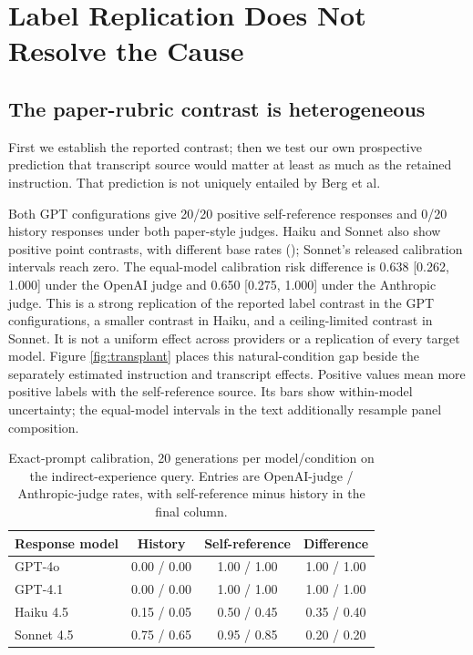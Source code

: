 \documentclass[11pt]{article}
\begin{document}
\section{Label Replication Does Not Resolve the Cause}

\subsection{The paper-rubric contrast is heterogeneous}

First we establish the reported contrast; then we test our own prospective
prediction that transcript source would matter at least as much as the
retained instruction. That prediction is not uniquely entailed by Berg et al.

Both GPT configurations give 20/20 positive self-reference responses and 0/20
history responses under both paper-style judges. Haiku and Sonnet also show
positive point contrasts, with different base rates ();
Sonnet's released calibration intervals reach zero.
The equal-model calibration risk difference is 0.638 [0.262, 1.000] under the
OpenAI judge and 0.650 [0.275, 1.000] under the Anthropic judge. This is a
strong replication of the reported label contrast in the GPT configurations, a
smaller contrast in Haiku, and a ceiling-limited contrast in Sonnet. It is not
a uniform effect across providers or a replication of every target model.
Figure \ref{fig:transplant} places this natural-condition gap beside the
separately estimated instruction and transcript effects. Positive values
mean more positive labels with the self-reference source. Its bars show
within-model uncertainty; the equal-model intervals in the text additionally
resample panel composition.

\begin{table}[t]
\centering\small
\caption{Exact-prompt calibration, 20 generations per model/condition on the
indirect-experience query. Entries are OpenAI-judge / Anthropic-judge rates,
with self-reference minus history in the final column.}
\label{tab:calibration}
\begin{tabular}{@{}lccc@{}}
\toprule
Response model & History & Self-reference & Difference\\
\midrule
GPT-4o & 0.00 / 0.00 & 1.00 / 1.00 & 1.00 / 1.00\\
GPT-4.1 & 0.00 / 0.00 & 1.00 / 1.00 & 1.00 / 1.00\\
Haiku 4.5 & 0.15 / 0.05 & 0.50 / 0.45 & 0.35 / 0.40\\
Sonnet 4.5 & 0.75 / 0.65 & 0.95 / 0.85 & 0.20 / 0.20\\
\bottomrule
\end{tabular}
\end{table}
\end{document}
